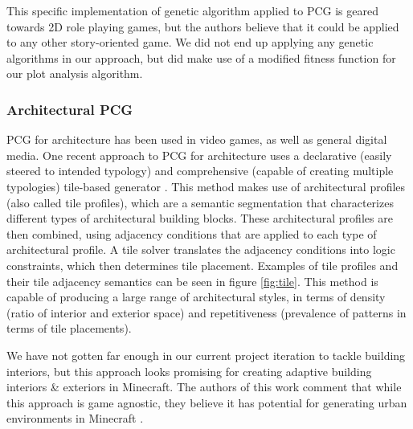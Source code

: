 \documentclass[11pt, oneside]{article}
\begin{document}
\begin{normalsize}
This specific implementation of genetic algorithm applied to PCG is geared towards 2D role playing games, but the authors believe that it could be applied to any other story-oriented game. We did not end up applying any genetic algorithms in our approach, but did make use of a modified fitness function for our plot analysis algorithm.

\subsubsection{Architectural PCG}

PCG for architecture has been used in video games, as well as general digital media. One recent approach to PCG for architecture uses a declarative (easily steered to intended typology) and comprehensive (capable of creating multiple typologies) tile-based generator \cite{van2020declarative}. This method makes use of architectural profiles (also called tile profiles), which are a semantic segmentation that characterizes different types of architectural building blocks. These architectural profiles are then combined, using adjacency conditions that are applied to each type of architectural profile. A tile solver translates the adjacency conditions into logic constraints, which then determines tile placement. Examples of tile profiles and their tile adjacency semantics can be seen in figure \ref{fig:tile}. This method is capable of producing a large range of architectural styles, in terms of density (ratio of interior and exterior space) and repetitiveness (prevalence of patterns in terms of tile placements). 

We have not gotten far enough in our current project iteration to tackle building interiors, but this approach looks promising for creating adaptive building interiors \& exteriors in Minecraft. The authors of this work comment that while this approach is game agnostic, they believe it has potential for generating urban environments in Minecraft \cite{van2020declarative}. 


\end{normalsize}
\end{document}
